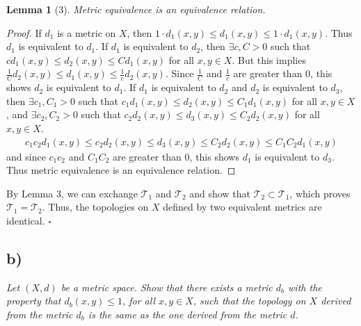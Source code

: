\documentclass[12pt]{article}
\theoremstyle{plain}
\newtheorem*{lemma*}{Lemma}
\begin{document}
\begin{lemma*}[3]
    Metric equivalence is an equivalence relation.
\end{lemma*}
\begin{proof}
    If $d_1$ is a metric on $X$, then $1\cdot d_1(x,y) \leq d_1(x,y) \leq 1\cdot d_1(x,y)$.  Thus $d_1$ is equivalent to $d_1$.  If $d_1$ is equivalent to $d_2$, then $\exists c,C > 0$ such that $cd_1(x,y) \leq d_2(x,y) \leq Cd_1(x,y)$ for all $x, y \in X$.  But this implies $\frac{1}{C}d_2(x,y) \leq d_1(x,y) \leq \frac{1}{c}d_2(x,y)$.  Since $\frac{1}{C}$ and $\frac{1}{c}$ are greater than $0$, this shows $d_2$ is equivalent to $d_1$.  If $d_1$ is equivalent to $d_2$ and $d_2$ is equivalent to $d_3$, then $\exists c_1,C_1 > 0$ such that $c_1d_1(x,y) \leq d_2(x,y) \leq C_1d_1(x,y)$ for all $x,y\in X$, and $\exists c_2,C_2 > 0$ such that $c_2d_2(x,y) \leq d_3(x,y) \leq C_2d_2(x,y)$ for all $x,y \in X$.
    \begin{align*}
        c_1c_2d_1(x,y) \leq c_2d_2(x,y) \leq d_3(x,y) \leq C_2d_2(x,y) \leq C_1C_2d_1(x,y)
    \end{align*}
    and since $c_1c_2$ and $C_1C_2$ are greater than $0$, this shows $d_1$ is equivalent to $d_3$.  Thus metric equivalence is an equivalence relation.
\end{proof}

By Lemma 3, we can exchange $\mathcal{T}_1$ and $\mathcal{T}_2$ and show that $\mathcal{T}_2 \subset \mathcal{T}_1$, which proves $\mathcal{T}_1 = \mathcal{T}_2$.  Thus, the topologies on $X$ defined by two equivalent metrics are identical. \hfill $\square$



\subsection*{ b)}
\emph{Let $(X, d)$ be a metric space.  Show that there exists a metric $d_b$ with the property that $d_b(x,y) \leq 1$, for all $x,y \in X$, such that the topology on $X$ derived from the metric $d_b$ is the same as the one derived from the metric $d$.}
\end{document}
